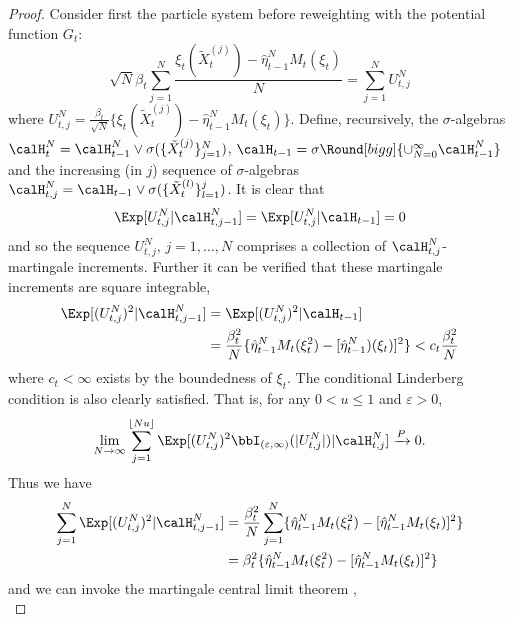 \begin{proof}
  Consider first the particle system before reweighting with the potential
  function $G_t$:
  \begin{equation}
    \sqrt{N}\beta_t
    \sum_{j=1}^N\frac{\xi_t(\tilde{X}_t^{(j)}) - \hat\eta_{t-1}^N M_t(\xi_t)}{N}
    = \sum_{j=1}^NU_{t,j}^N
  \end{equation}
  where $U_{t,j}^N = \frac{\beta_t}{\sqrt{N}}\{\xi_t(\tilde{X}_t^{(j)}) -
  \hat\eta_{t-1}^N M_t(\xi_t)\}$. Define, recursively, the $\sigma$-algebras
  $\calH_t^N = \calH_{t-1}^N \vee \sigma(\{\tilde{X}_{t}^{(j)}\}_{j=1}^N)$,
  $\calH_{t-1} = \sigma\Round[bigg]{\cup_{N=0}^\infty \calH_{t-1}^N}$ and the
  increasing (in $j$) sequence of $\sigma$-algebras $\calH_{t,j}^N =
  \calH_{t-1}\vee\sigma(\{\tilde{X}_t^{(l)}\}_{l=1}^j)$. It is clear that
  \begin{equation}
    \Exp[U_{t,j}^N|\calH_{t,j-1}^N] = \Exp[U_{t,j}^N|\calH_{t-1}] = 0
  \end{equation}
  and so the sequence $U_{t,j}^N$, $j = 1,\dots,N$ comprises a collection of
  $\calH_{t,j}^N$-martingale increments. Further it can be verified that these
  martingale increments are square integrable,
  \begin{align*}
    \Exp[(U_{t,j}^N)^2|\calH_{t,j-1}^N]
    &= \Exp[(U_{t,j}^N)^2|\calH_{t-1}] \\
    &= \frac{\beta_t^2}{N}\{\hat\eta_{t-1}^N M_t(\xi_t^2) -
    [\hat\eta_{t-1}^N)(\xi_t)]^2\}
    < c_t \frac{\beta_t^2}{N}
  \end{align*}
  where $c_t < \infty$ exists by the boundedness of $\xi_t$. The conditional
  Linderberg condition is also clearly satisfied. That is, for any $0 <
  u\le1$ and $\varepsilon>0$,
  \begin{equation*}
    \lim_{N\to\infty}\sum_{j=1}^{\lfloor Nu\rfloor}
    \Exp[(U_{t,j}^N)^2\bbI_{(\varepsilon,\infty)}(|U_{t,j}^N|)|\calH_{t,j}^N]
    \xrightarrow{P}0.
  \end{equation*}
  Thus we have
  \begin{align*}
    \sum_{j=1}^N\Exp[(U_{t,j}^N)^2|\calH_{t,j-1}^N]
    &= \frac{\beta_t^2}{N}\sum_{j=1}^N
    \{\hat\eta_{t-1}^N M_t(\xi_t^2) - [\hat\eta_{t-1}^N M_t(\xi_t)]^2\} \\
    &= \beta_t^2     \{\hat\eta_{t-1}^N M_t(\xi_t^2) - [\hat\eta_{t-1}^N M_t(\xi_t)]^2\}
  \end{align*}
  and we can invoke the martingale central limit theorem
  \cite[][pp.~543]{Shiryaev:1995vp},
  \begin{equation}

\end{equation}
\end{proof}
